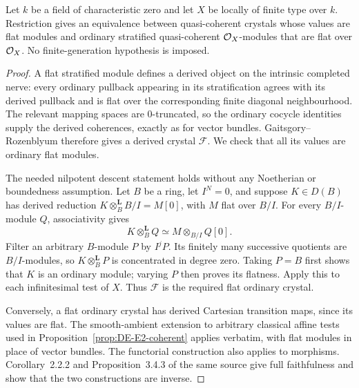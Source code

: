 \begin{proposition}\label{prop:DE-E2-flat-charzero}
Let $k$ be a field of characteristic zero and let $X$ be locally of finite type over $k$.  Restriction gives an equivalence between quasi-coherent crystals whose values are flat modules and ordinary stratified quasi-coherent $\mathcal O_X$-modules that are flat over $\mathcal O_X$.  No finite-generation hypothesis is imposed.
\end{proposition}
\begin{proof}
A flat stratified module defines a derived object on the intrinsic completed nerve: every ordinary pullback appearing in its stratification agrees with its derived pullback and is flat over the corresponding finite diagonal neighbourhood.  The relevant mapping spaces are $0$-truncated, so the ordinary cocycle identities supply the derived coherences, exactly as for vector bundles.  Gaitsgory--Rozenblyum \cite[Proposition~3.4.3]{GaitsgoryRozenblyum2014} therefore gives a derived crystal $\mathcal F$.  We check that all its values are ordinary flat modules.

The needed nilpotent descent statement holds without any Noetherian or boundedness assumption.  Let $B$ be a ring, let $I^N=0$, and suppose $K\in D(B)$ has derived reduction $K\otimes_B^{\mathbf L}B/I=M[0]$, with $M$ flat over $B/I$.  For every $B/I$-module $Q$, associativity gives
\[
 K\otimes_B^{\mathbf L}Q\simeq M\otimes_{B/I}Q[0].
\]
Filter an arbitrary $B$-module $P$ by $I^jP$.  Its finitely many successive quotients are $B/I$-modules, so $K\otimes_B^{\mathbf L}P$ is concentrated in degree zero.  Taking $P=B$ first shows that $K$ is an ordinary module; varying $P$ then proves its flatness.  Apply this to each infinitesimal test of $X$.  Thus $\mathcal F$ is the required flat ordinary crystal.

Conversely, a flat ordinary crystal has derived Cartesian transition maps, since its values are flat.  The smooth-ambient extension to arbitrary classical affine tests used in Proposition~\ref{prop:DE-E2-coherent} applies verbatim, with flat modules in place of vector bundles.  The functorial construction also applies to morphisms.  Corollary~2.2.2 and Proposition~3.4.3 of the same source give full faithfulness and show that the two constructions are inverse.
\end{proof}

